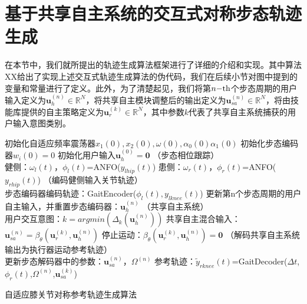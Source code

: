 \section{基于共享自主系统的交互式对称步态轨迹生成}
在本节中，我们就所提出的轨迹生成算法框架进行了详细的介绍和实现。其中算法 XX给出了实现上述交互式轨迹生成算法的伪代码，我们在后续小节对图中提到的变量和常量进行了定义。此外，为了清楚起见，我们将第$n{\rm{ - th}}$个步态周期的用户输入定义为${\pmb{u}}_h^{(n)} \in {\mathbb{R}^N}$，将共享自主模块调整后的输出定义为${\pmb{u}}_{sa}^{(n)} \in {\mathbb{R}^N}$，将由技能库提供的自主策略定义为${\pmb{u}}_r^{(k)} \in {\mathbb{R}^N}$，其中参数$k$代表了共享自主系统捕获的用户输入意图类别。   
\begin{algorithm}[h]
  \SetAlgoLined
  初始化自适应频率震荡器$x_1(0),x_2(0),\omega(0),\alpha_0(0)\alpha_1(0)$\;
  初始化步态编码器$w_i(0)=0$\;
  初始化用户输入$\pmb{u}_h^{(0)}=\pmb{0}$\;
  {
    （步态相位跟踪）\\
    健侧：$\omega_l(t)$，$\phi_l(t)$=ANFO($y_{lhip}(t)$) \;
    患侧：$\omega_r(t)$，$\phi_r(t)$=ANFO($y_{rhip}(t)$) \;
    （编码健侧输入关节轨迹）\\
    {
      步态编码器编码轨迹：GaitEncoder($\phi_l(t),y_{lknee}(t)$) \;
    }
    {
      更新第n个步态周期的用户自主输入，并重置步态编码器：$\pmb{u}_h^{(n)}$ 
    }
    （共享自主系统）\\
    {
      {
        用户交互意图：$k=argmin(\Delta_k(\pmb{u}_h^{(n)}))$ \;
        共享自主混合输入：$\pmb{u}_{sa}^{(n)} = \beta_{\theta}(\pmb{u}_r^{(k)}, \pmb{u}_h^{(n)})$\;
      }
    }
    {
      停止运动：$\beta_{\theta}(\pmb{u}_r^{(k)}, \pmb{u}_h^{(n)})=\pmb{0}$
    }
    （解码共享自主系统输出为执行器运动参考轨迹）\\
    {
      更新步态解码器中的参数：$\pmb{u}_{sa}^{(n)}$，$\Omega^{(n)}$\;
    }
    {
      参考轨迹：$\widetilde{y}_{rknee}(t)$=GaitDecoder($\Delta t$, $\phi_r(t)$,$\Omega^{(n)}$,$\pmb{u}_{sa}^{(k)}$) \;
    }
  }
  \caption{自适应膝关节对称参考轨迹生成算法}
  \label{algo:5-1}
\end{algorithm}  

